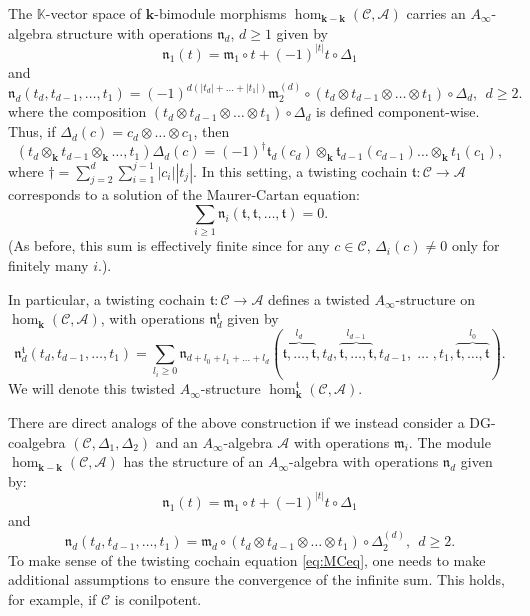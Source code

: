 \documentclass{gtpart}
\renewcommand{\k}{\mathbf{k}}
\newcommand{\m}{\mathfrak{m}}
\newcommand{\n}{\mathfrak{n}}
\renewcommand{\t}{\mathfrak{t}}
\newcommand{\A}{\mathscr{A}}
\renewcommand{\C}{\mathscr{C}}
\begin{document}
The $\mathbb{K}$-vector space of $\k$-bimodule morphisms $\hom_{\k-\k}(\C,\A)$ carries an $A_\infty$-algebra
structure with operations $\mathfrak{n}_d$, $d\ge 1$ given by
\[ \mathfrak{n}_1 (t) = \m_1 \circ t + (-1)^{|t|} t \circ \Delta_1 \]
and 
\[ 
\mathfrak{n}_d (t_d, t_{d-1}, \ldots, t_1) = (-1)^{d(|t_d|+\ldots+|t_1|)} \m_2^{(d)} \circ (t_d \otimes t_{d-1} \otimes
\ldots \otimes t_1) \circ \Delta_d ,  \ \ d\geq 2. 
\] 
where the composition $(t_d \otimes t_{d-1} \otimes \ldots \otimes t_1) \circ \Delta_d$ is defined
component-wise. Thus, if $\Delta_d(c)= c_d \otimes \ldots \otimes c_1$, then 
\[ (t_d \otimes_\k t_{d-1} \otimes_\k \ldots, t_1)\Delta_d(c) = (-1)^\dagger \t_d(c_d)\otimes_\k
\t_{d-1}(c_{d-1}) \ldots  \otimes_\k t_1(c_1), \] 
where $\dagger = \sum_{j=2}^d \sum_{i=1}^{j-1} |c_i||t_j|$.
In this setting, a twisting cochain $\mathfrak{t}\colon \C \to \A$ corresponds to a solution of the Maurer-Cartan equation:
\begin{equation}\label{eq:MCeq} 
\sum_{i \geq 1} \mathfrak{n}_i (\mathfrak{t}, \mathfrak{t}, \ldots, \mathfrak{t}) =0. 
\end{equation} 
(As before, this sum is effectively finite since for any $c \in \C$, $\Delta_i(c)\neq 0$ only for finitely many $i$.). 

In particular, a twisting cochain $\mathfrak{t}\colon \mathscr{C} \to \mathscr{A}$ defines a twisted $A_\infty$-structure on $\hom_\k (\C, \A)$, with operations $\mathfrak{n}^{\mathfrak{t}}_{d}$ given by
\[ 
\n^\mathfrak{t}_d (t_d,t_{d-1},\ldots, t_1) = \sum_{l_i \geq 0} \n_{d+l_0+l_1+\ldots+l_d}
(\overbrace{\mathfrak{t},\ldots, \mathfrak{t}}^{l_d},
t_d, \overbrace{\mathfrak{t},\ldots, \mathfrak{t}}^{l_{d-1}}, t_{d-1},\;\ldots\;, 
t_1,\overbrace{\mathfrak{t},\ldots, \mathfrak{t}}^{l_0}).  
\]
We will denote this twisted $A_\infty$-structure $\hom^\mathfrak{t}_{\k}(\C,\A)$.

There are direct analogs of the above construction if we instead consider a DG-coalgebra $(\mathscr{C}, \Delta_1, \Delta_2)$ and an $A_\infty$-algebra $\mathscr{A}$ with operations $\m_i$. 
The module $\hom_{\k-\k} (\mathscr{C},\mathscr{A})$ has the structure of an $A_\infty$-algebra with operations $\mathfrak{n}_d$ given by:
\[ 
\mathfrak{n}_1 (t) = \m_1 \circ t + (-1)^{|t|} t \circ \Delta_1 
\]
and 
\[ 
\mathfrak{n}_d (t_d, t_{d-1}, \ldots, t_1) = \m_d \circ (t_d \otimes t_{d-1} \otimes
\ldots \otimes t_1) \circ \Delta_2^{(d)} ,  \ \ d\geq 2. 
\] 
To make sense of the twisting cochain equation \eqref{eq:MCeq}, one needs to make additional assumptions to ensure the convergence of the infinite sum. This holds, for example, if $\C$ is conilpotent.
\end{document}
